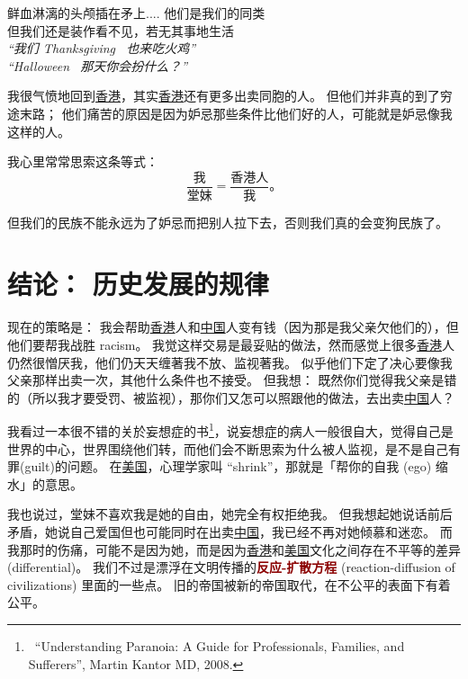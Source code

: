 \documentclass[12pt]{report}
\newcommand{\cc}[2]{#1}
\newcommand{\cc}[2]{#2}
\newcommand{\tab}{\hspace*{1cm}}
\newcommand{\speechCn}[1]{\textrm{\textit{\textcolor{Speech}{#1}}}}
\renewcommand{\em}[1]{\textbf{\textcolor{DarkRed}{#1}}}
\begin{document}
{{}

\cc{
\tab 鲜血淋漓的头颅插在矛上.... 他们是我们的同类 \\
\tab 但我们还是装作看不见，若无其事地生活 \\
\tab \speechCn{``我们 Thanksgiving \ 也来吃火鸡''} \\
\tab \speechCn{``Halloween \ 那天你会扮什么？''}
}{
	
}

\cc{
我很气愤地回到\uline{香港}，其实\uline{香港}还有更多出卖同胞的人。%
但他们并非真的到了穷途末路； 他们痛苦的原因是因为妒忌那些条件比他们好的人，可能就是妒忌像我这样的人。
}{
	
}

\cc{
我心里常常思索这条等式：
$$ \frac{\mbox{我}}{\mbox{堂妹}} = \frac{\mbox{香港人}}{\mbox{我}} \mbox{。}$$
}{
	
}

\cc{
但我们的民族不能永远为了妒忌而把别人拉下去，否则我们真的会变狗民族了。
}{
	
}

\chapter{\cc{结论： 历史发展的规律}{Conclusion:  patterns of history}}

\cc{
现在的策略是： 我会帮助\uline{香港}人和\uline{中国}人变有钱（因为那是我父亲欠他们的），但他们要帮我战胜 racism。 我觉这样交易是最妥贴的做法，然而感觉上很多\uline{香港}人仍然很憎厌我，他们仍天天缠著我不放、监视著我。 似乎他们下定了决心要像我父亲那样出卖一次，其他什么条件也不接受。 但我想： 既然你们觉得我父亲是错的（所以我才要受罚、被监视），那你们又怎可以照跟他的做法，去出卖\uline{中国}人？
}{
	
}

\cc{
我看过一本很不错的关於妄想症的书\footnote{\ ``Understanding Paranoia: A Guide for Professionals, Families, and Sufferers'', Martin Kantor MD, 2008.}，说妄想症的病人一般很自大，觉得自己是世界的中心，世界围绕他们转，而他们会不断思索为什么被人监视，是不是自己有罪(guilt)的问题。 在\uline{美国}，心理学家叫 ``shrink''，那就是「帮你的自我 (ego) 缩水」的意思。
}{
	
}

\cc{
我也说过，堂妹不喜欢我是她的自由，她完全有权拒绝我。 但我想起她说话前后矛盾，她说自己爱国但也可能同时在出卖\uline{中国}，我已经不再对她倾慕和迷恋。 而我那时的伤痛，可能不是因为她，而是因为\uline{香港}和\uline{美国}文化之间存在不平等的差异 (differential)。 我们不过是漂浮在文明传播的\em{反应-扩散方程} (reaction-diffusion of civilizations) 里面的一些点。 旧的帝国被新的帝国取代，在不公平的表面下有着公平。
}{
	
}}
\end{document}
